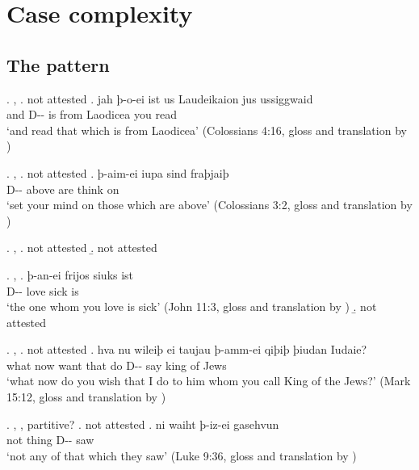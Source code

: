 
\chapter{Case complexity}

\section{The pattern}


\ex. , 
\a.  not attested
\bg. jah þ-o-ei ist us Laudeikaion jus ussiggwaid\\
 and D-- is\scsub{[nom]} from Laodicea you read\scsub{[acc]}\\
 `and read that which is from Laodicea' \hfill (Colossians 4:16, gloss and translation by \citealt[357]{harbert1978})

\ex. , 
\a.  not attested
\bg. þ-aim-ei iupa sind fraþjaiþ\\
 D-- above are\scsub{[nom]} {think on}\scsub{[dat]}\\
 `set your mind on those which are above' \hfill (Colossians 3:2, gloss and translation by \citealt[339]{harbert1978})

\ex. , 
\a.  not attested
\b.  not attested

\ex. , 
\ag. þ-an-ei frijos siuks ist\\
 D-- love\scsub{[acc]} sick is\scsub{[nom]}\\
 `the one whom you love is sick' \hfill (John 11:3, gloss and translation by \citealt[342]{harbert1978})
\b.  not attested

\ex. , 
\a.  not attested
\bg. hva nu wileiþ ei taujau þ-amm-ei qiþiþ þiudan Iudaie?\\
 what now want that do\scsub{[dat]} D-- say\scsub{[acc]} king {of Jews}\\
 `what now do you wish that I do to him whom you call King of the Jews?' \hfill (Mark 15:12, gloss and translation by \citealt[339]{harbert1978})

\ex. , , partitive?
\a.  not attested
\bg. ni waiht þ-iz-ei gasehvun\\
 not thing\scsub{[gen]} D-- saw\scsub{[acc]}\\
 `not any of that which they saw' \hfill (Luke 9:36, gloss and translation by \citealt[340]{harbert1978})

